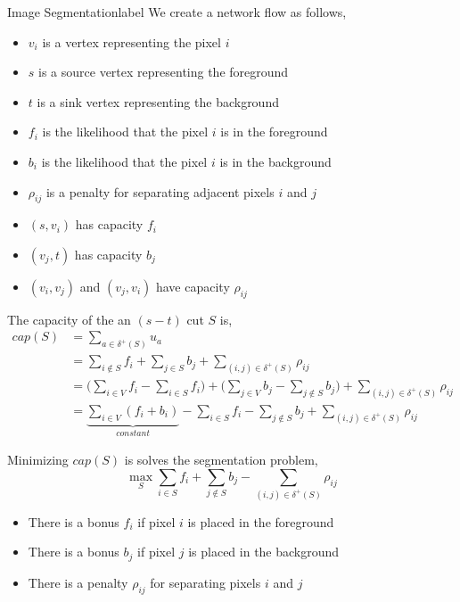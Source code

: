 	\begin{ex}{Image Segmentation}{label} 
 		We create a network flow as follows,	
 		\begin{itemize}
 				\item $v_i$ is a vertex representing the pixel $i$
 				\item $s$ is a source vertex representing the foreground
 				\item $t$ is a sink vertex representing the background
 				\item $f_i$ is the likelihood that the pixel $i$ is in the foreground
 				\item $b_i$ is the likelihood that the pixel $i$ is in the background
 				\item $\rho_{ij}$ is a penalty for separating adjacent pixels $i$ and $j$
 				\item $(s, v_i)$ has capacity $f_i$
 				\item $(v_j, t)$ has capacity $b_j$
 				\item $(v_i,v_j)$ and $(v_j,v_i)$ have capacity $\rho_{ij}$
 		\end{itemize}

 		The capacity of the an $(s-t)$ cut $S$ is,
 		\begin{align*}
 			cap(S) &= \sum_{a \in \delta^+(S)}  u_a \\
 			       &= \sum_{i \not\in S} f_i + \sum_{j \in S} b_j + \sum_{(i,j) \in \delta^+(S)} \rho_{ij} \\
 			       &= \big(\sum_{i \in V} f_i - \sum_{i \in S} f_i\big) + \big(\sum_{j \in V} b_j - \sum_{j \not\in S} b_j\big) + \sum_{(i,j) \in \delta^+(S)} \rho_{ij} \\
 			       &= \underbrace{\sum_{i \in V}(f_i + b_i)}_{constant} - \sum_{i \in S}f_i - \sum_{j \not\in S}b_j + \sum_{(i,j) \in \delta^+(S)} \rho_{ij}
 		\end{align*}

 		Minimizing $cap(S)$ is solves the segmentation problem,
 		\[ \max_S \sum_{i \in S}f_i + \sum_{j \not\in S} b_j - \sum_{(i,j) \in \delta^+(S)} \rho_{ij}\]
 		\begin{itemize}
 			\item There is a bonus $f_i$ if pixel $i$ is placed in the foreground
 			\item There is a bonus $b_j$ if pixel $j$ is placed in the background
 			\item There is a penalty $\rho_{ij}$ for separating pixels $i$ and $j$
 		\end{itemize}
 	\end{ex}

